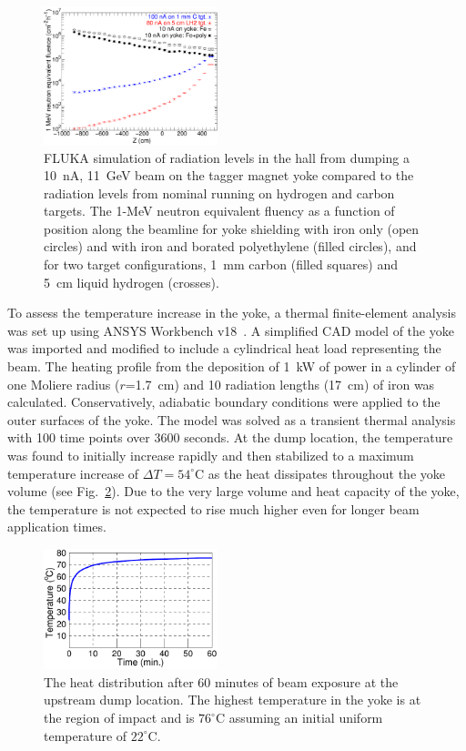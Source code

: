 \begin{figure}[hbt]
\begin{center}
\includegraphics[width=0.45\textwidth]{Radiation.pdf}
\caption{FLUKA simulation of radiation levels in the hall from dumping a 10~nA, 11~GeV beam on the tagger
  magnet yoke compared to the radiation levels from nominal running on hydrogen and carbon targets. The 1-MeV
  neutron equivalent fluency as a function of position along the beamline for yoke shielding with iron only (open
  circles) and with iron and borated polyethylene (filled circles), and for two target configurations, 1~mm carbon
  (filled squares) and 5~cm liquid hydrogen (crosses).}
\label{fig:raddem}
\end{center}
\end{figure}

To assess the temperature increase in the yoke, a thermal finite-element analysis was set up using ANSYS
Workbench v18~\cite{ANSYS}. A simplified CAD model of the yoke was imported and modified to include a
cylindrical heat load representing the beam. The heating profile from the deposition of 1~kW of power in a
cylinder of one Moliere radius ($r$=1.7~cm) and 10 radiation lengths (17~cm) of iron was calculated. Conservatively,
adiabatic boundary conditions were applied to the outer surfaces of the yoke. The model was solved as a transient
thermal analysis with 100 time points over 3600 seconds. At the dump location, the temperature was found to
initially increase rapidly and then stabilized to a maximum temperature increase of $\Delta T = 54^\circ$C as the
heat dissipates throughout the yoke volume (see Fig.~\ref{fig:ansys_yoke}). Due to the very large volume and heat
capacity of the yoke, the temperature is not expected to rise much higher even for longer beam application times.

\begin{figure}[hbt]
\centering
\includegraphics[width=0.45\textwidth]{YokeHeating.pdf}
\caption{The heat distribution after 60 minutes of beam exposure at the upstream dump location. The highest
  temperature in the yoke is at the region of impact and is $76^\circ$C assuming an initial uniform temperature
  of $22^\circ$C.}
\label{fig:ansys_yoke}
\end{figure}

